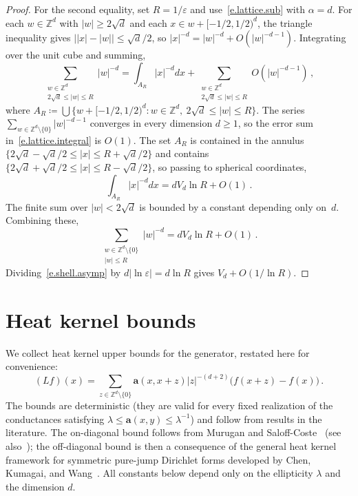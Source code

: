 \documentclass[11pt]{amsart}
\theoremstyle{plain}
\theoremstyle{definition}
\theoremstyle{remark}
\newcommand{\Zd}{\mathbb{Z}^d}
\renewcommand{\a}{\mathbf{a}}
\newcommand{\eps}{\varepsilon}
\begin{document}
\begin{proof}
		For the second equality, set $R = 1/\eps$ and use~\eqref{e.lattice.sub} with $\alpha = d$.
		For each $w \in \Zd$ with $|w| \ge 2\sqrt{d}$ and each $x \in w + [-1/2, 1/2)^d$, the triangle inequality gives $\bigl||x| - |w|\bigr| \le \sqrt{d}/2$, so $|x|^{-d} = |w|^{-d} + O(|w|^{-d-1})$.
		Integrating over the unit cube and summing,
		\begin{equation}
			\label{e.lattice.integral}
			\sum_{\substack{w \in \Zd \\ 2\sqrt{d} \le |w| \le R}} |w|^{-d}
			=
			\int_{A_R} |x|^{-d} dx + \sum_{\substack{w \in \Zd \\ 2\sqrt{d} \le |w| \le R}} O(|w|^{-d-1})\,,
		\end{equation}
		where $A_R \coloneqq \bigcup \{w + [-1/2, 1/2)^d : w \in \Zd,\ 2\sqrt{d} \le |w| \le R\}$.
		The series $\sum_{w \in \Zd \setminus \{0\}} |w|^{-d-1}$ converges in every dimension $d \ge 1$, so the error sum in~\eqref{e.lattice.integral} is $O(1)$.
		The set $A_R$ is contained in the annulus $\{2\sqrt{d} - \sqrt{d}/2 \le |x| \le R + \sqrt{d}/2\}$ and contains $\{2\sqrt{d} + \sqrt{d}/2 \le |x| \le R - \sqrt{d}/2\}$, so passing to spherical coordinates,
		\[
		\int_{A_R} |x|^{-d} dx = d V_d \ln R + O(1)\,.
		\]
		The finite sum over $|w| < 2\sqrt{d}$ is bounded by a constant depending only on~$d$. Combining these,
		\begin{equation}
			\label{e.shell.asymp}
			\sum_{\substack{w \in \Zd \setminus \{0\} \\ |w| \le R}} |w|^{-d}
			=
			d V_d \ln R + O(1)\,.
		\end{equation}
		Dividing~\eqref{e.shell.asymp} by $d\left| \ln\eps \right| = d\ln R$ gives $V_d + O(1/\ln R)$.
	\end{proof}
	
	\section{Heat kernel bounds}
	\label{sec:heatkernel}
	
	We collect heat kernel upper bounds for the generator, restated here for convenience:
	\[
	(Lf)(x) = \sum_{z \in \Zd \setminus \{0\}} \a(x, x{+}z) |z|^{-(d+2)} \bigl(f(x{+}z) - f(x)\bigr)\,.
	\]
	The bounds are deterministic (they are valid for every fixed realization of the conductances satisfying $\lambda \le \a(x,y) \le \lambda^{-1}$) and follow from results in the literature.
	The on-diagonal bound follows from Murugan and Saloff-Coste~\cite{MuruganSaloffCoste2015} (see also~\cite{MuruganSaloffCoste2017,MuruganSaloffCoste2019}); the off-diagonal bound is then a consequence of the general heat kernel framework for symmetric pure-jump Dirichlet forms developed by Chen, Kumagai, and Wang~\cite{ChenKumagaiWang2019}.
	All constants below depend only on the ellipticity $\lambda$ and the dimension $d$.
	
\end{document}
